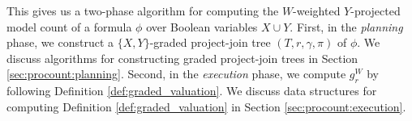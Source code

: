 This gives us a two-phase algorithm for computing the $W$-weighted $Y$-projected model count of a formula $\phi$ over Boolean variables $X \cup Y$.
First, in the \emph{planning} phase, we construct a $\{X, Y\}$-graded project-join tree $(T, r, \gamma, \pi)$ of $\phi$.
We discuss algorithms for constructing graded project-join trees in Section \ref{sec:procount:planning}.
Second, in the \emph{execution} phase, we compute $g^W_r$ by following Definition \ref{def:graded_valuation}.
We discuss data structures for computing Definition \ref{def:graded_valuation} in Section \ref{sec:procount:execution}.

